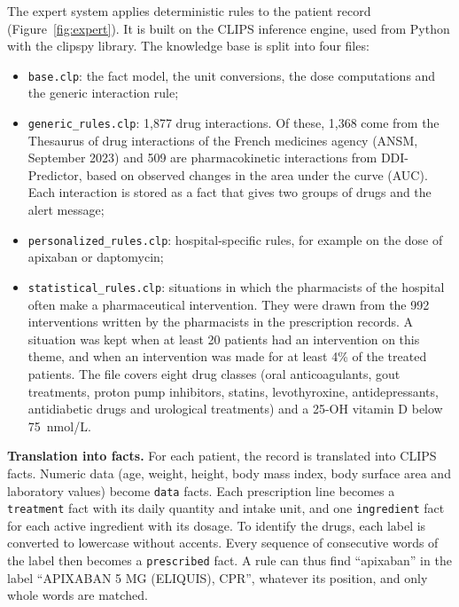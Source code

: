 \documentclass{article}
\begin{document}
The expert system applies deterministic rules to the patient record (Figure~\ref{fig:expert}). It is built on the CLIPS inference engine, used from Python with the clipspy library. The knowledge base is split into four files:
\begin{itemize}
	\item \texttt{base.clp}: the fact model, the unit conversions, the dose computations and the generic interaction rule;
	\item \texttt{generic\_rules.clp}: 1,877 drug interactions. Of these, 1,368 come from the Thesaurus of drug interactions of the French medicines agency (ANSM, September 2023) and 509 are pharmacokinetic interactions from DDI-Predictor, based on observed changes in the area under the curve (AUC). Each interaction is stored as a fact that gives two groups of drugs and the alert message;
	\item \texttt{personalized\_rules.clp}: hospital-specific rules, for example on the dose of apixaban or daptomycin;
	\item \texttt{statistical\_rules.clp}: situations in which the pharmacists of the hospital often make a pharmaceutical intervention. They were drawn from the 992 interventions written by the pharmacists in the prescription records. A situation was kept when at least 20 patients had an intervention on this theme, and when an intervention was made for at least 4\% of the treated patients. The file covers eight drug classes (oral anticoagulants, gout treatments, proton pump inhibitors, statins, levothyroxine, antidepressants, antidiabetic drugs and urological treatments) and a 25-OH vitamin D below 75~nmol/L.
\end{itemize}

\textbf{Translation into facts.} For each patient, the record is translated into CLIPS facts. Numeric data (age, weight, height, body mass index, body surface area and laboratory values) become \texttt{data} facts. Each prescription line becomes a \texttt{treatment} fact with its daily quantity and intake unit, and one \texttt{ingredient} fact for each active ingredient with its dosage. To identify the drugs, each label is converted to lowercase without accents. Every sequence of consecutive words of the label then becomes a \texttt{prescribed} fact. A rule can thus find ``apixaban'' in the label ``APIXABAN 5 MG (ELIQUIS), CPR'', whatever its position, and only whole words are matched.
\end{document}
